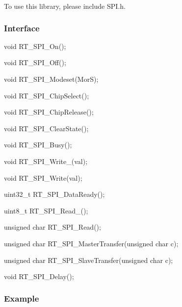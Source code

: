 To use this library, please include {\ttfamily S\+P\+I.\+h}.

\subsubsection*{Interface}


\begin{DoxyCode}
\textcolor{keywordtype}{void} RT\_SPI\_On();

\textcolor{keywordtype}{void} RT\_SPI\_Off();

\textcolor{keywordtype}{void} RT\_SPI\_Modeset(MorS);

\textcolor{keywordtype}{void} RT\_SPI\_ChipSelect();

\textcolor{keywordtype}{void} RT\_SPI\_ChipRelease();

\textcolor{keywordtype}{void} RT\_SPI\_ClearState();

\textcolor{keywordtype}{void} RT\_SPI\_Busy();

\textcolor{keywordtype}{void} RT\_SPI\_Write\_(val);

\textcolor{keywordtype}{void} RT\_SPI\_Write(val);

uint32\_t RT\_SPI\_DataReady();

uint8\_t RT\_SPI\_Read\_();

\textcolor{keywordtype}{unsigned} \textcolor{keywordtype}{char} RT\_SPI\_Read();

\textcolor{keywordtype}{unsigned} \textcolor{keywordtype}{char} RT\_SPI\_MasterTransfer(\textcolor{keywordtype}{unsigned} \textcolor{keywordtype}{char} c);

\textcolor{keywordtype}{unsigned} \textcolor{keywordtype}{char} RT\_SPI\_SlaveTransfer(\textcolor{keywordtype}{unsigned} \textcolor{keywordtype}{char} c);

\textcolor{keywordtype}{void} RT\_SPI\_Delay();
\end{DoxyCode}


\subsubsection*{Example}


